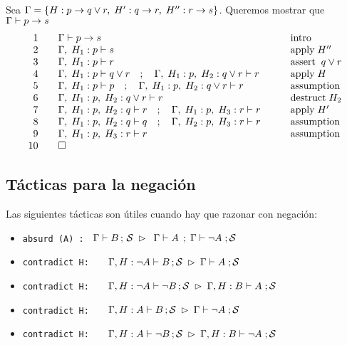\documentclass[11pt,letterpaper]{article}
\begin{document}
\item Sea
$\Gamma=\{H:p \to q \lor  r ,\; H': q\to r,\;H'': r\to s\}$. 
Queremos mostrar que $\Gamma\vdash p\to s $ 
\[
\begin{array}{rll}
1\quad & \G\vdash p\to s &  \qquad \mbox{intro} \\
2 \quad & \G,\;H_1: p \vdash s & \qquad \mbox {apply}\; H'' \\ %
3 \quad & \G,\;H_1: p \vdash r & \qquad \mbox{assert} \;\; q \lor r \\
4 \quad & \G,\;H_1: p\vdash q\lor r\quad  ; \quad  \G,\;H_1: p,\;H_2: q\lor 
r\vdash r &  \qquad \mbox{apply}\; H \\ %
5 \quad & \G,\;H_1: p\vdash p\quad  ; \quad  \G,\;H_1: p,\;H_2: q\lor r\vdash 
r& \qquad \mbox{assumption} \\ 
6 \quad & \G,\;H_1: p,\;H_2: q\lor r\vdash r & \qquad \mbox{destruct} \;H_2 \\ 
7\quad & \G,\;H_1: p,\;H_2: q \vdash r \quad  ; \quad  \G,\;H_1: p,\;H_3: r 
\vdash r &  \qquad \mbox{apply}\; H' \\ %
8 \quad & \G,\;H_1: p,\;H_2: q \vdash q \quad  ; \quad  \G,\;H_2: p,\;H_3: r 
\vdash r & \qquad \mbox{assumption} \\
9 \quad & \G,\;H_1: p,\;H_3: r \vdash r & \qquad  \mbox{assumption} \\
10 \quad & \square & 
\end{array}
\]
\ei


\subsection{Tácticas para la negación}
Las siguientes tácticas son útiles cuando hay que razonar con negación:

\begin{itemize}

 \item \texttt{absurd (A) : }  
  $\Gamma \vdash B \, ; \, \mathcal{S}\;\rhd\;\;\Gamma \vdash A \, \; ;\;\Gamma\vdash \neg A\; ;\mathcal{S}$
 \item \texttt{contradict H: } 
  $\quad \Gamma, H:\neg A\vdash B \,;\mathcal{S}\;\rhd\;\Gamma\vdash A\; ;\mathcal{S}$
 \item \texttt{contradict H: } 
  $\quad \Gamma, H:\neg A\vdash \neg B \,;\mathcal{S}\;\rhd\;\Gamma, H:B\vdash A\; ;\mathcal{S}$
 \item \texttt{contradict H: } 
  $\quad \Gamma, H: A\vdash B \, ;\mathcal{S}\;\rhd\;\Gamma\vdash \neg A\; ;\mathcal{S}$
 \item \texttt{contradict H: } 
  $\quad \Gamma, H: A\vdash \neg B \, ;\mathcal{S}\;\rhd\;\Gamma, H:B\vdash \neg A\; ;\mathcal{S}$
\end{itemize}
\end{document}
